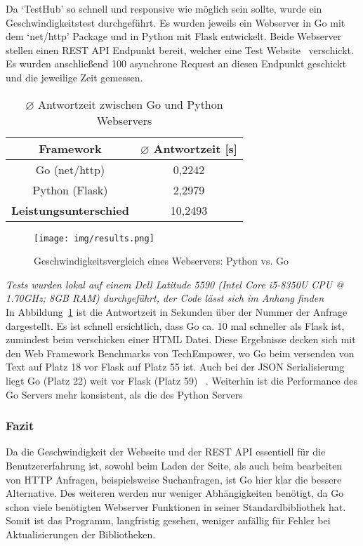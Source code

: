 Da `TestHub' so schnell und responsive wie möglich sein sollte, wurde ein 
Geschwindigkeitstest durchgeführt. Es wurden jeweils ein Webserver in Go mit 
dem `net/http' Package und in Python mit Flask entwickelt. Beide Webserver stellen
einen \gls{REST} \gls{API} Endpunkt bereit, welcher eine Test Website~\cite{Bra22} verschickt.
Es wurden anschließend 100 asynchrone Request an diesen Endpunkt geschickt und die jeweilige
Zeit gemessen.

\begin{table}[h!]
    \centering
    \begin{tabular}{|c | c|} 
     \hline
     \textbf{Framework} & \textbf{$\diameter$ Antwortzeit [s]} \\ [0.5ex] 
     \hline
     Go (net/http) & 0,2242 \\ [0.5ex]
     \hline
     Python (Flask) & 2,2979 \\ [0.5ex] 
     \hline
     \textbf{Leistungsunterschied} & 10,2493 \\ [1ex] 
     \hline
    \end{tabular}
    \caption{$\diameter$ Antwortzeit zwischen Go und Python Webservers}
    \label{table:1}
\end{table}

\begin{figure}[H]
    \texttt{[image: img/results.png]}
    \caption{Geschwindigkeitsvergleich eines Webservers: Python vs. Go}\label{fig:speedtestresults}
\end{figure}

\textit{Tests wurden lokal auf einem Dell Latitude 5590 (Intel Core i5-8350U CPU
@ 1.70GHz; 8GB RAM) durchgeführt, der Code lässt sich im Anhang finden} \\[2ex]

In Abbildung~\ref{fig:speedtestresults} ist die Antwortzeit in Sekunden über der Nummer 
der Anfrage dargestellt. Es ist schnell ersichtlich, dass Go ca. 10 mal schneller
als Flask ist, zumindest beim verschicken einer HTML Datei. Diese Ergebnisse 
decken sich mit den Web Framework Benchmarks von TechEmpower, wo Go beim 
versenden von Text auf Platz 18 vor Flask auf Platz 55 ist. Auch bei der 
\gls{JSON} Serialisierung liegt Go (Platz 22) weit vor Flask (Platz 59)
~\cite{Tec21}. Weiterhin ist die Performance des Go Servers mehr konsistent, als
die des Python Servers\\

\subsubsection{Fazit}
Da die Geschwindigkeit der Webseite und der \gls{REST} \gls{API} essentiell für 
die Benutzererfahrung ist, sowohl beim Laden der Seite, als auch beim bearbeiten
von \gls{HTTP} Anfragen, beispielsweise Suchanfragen, ist Go hier klar die
bessere Alternative. Des weiteren werden nur weniger Abhängigkeiten benötigt, da
Go schon viele benötigten Webserver Funktionen in seiner Standardbibliothek hat.
Somit ist das Programm, langfristig gesehen, weniger anfällig für Fehler bei 
Aktualisierungen der Bibliotheken.




